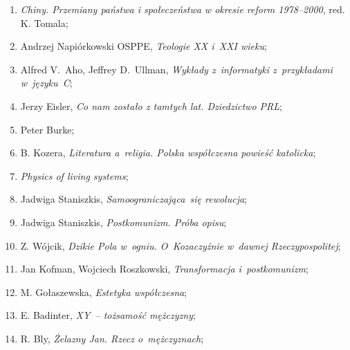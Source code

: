 \documentclass[a4paper,11pt]{article}
\begin{document}
\begin{enumerate}
\item \textit{Chiny. Przemiany państwa i społeczeństwa w okresie reform
    1978--2000}, red. K. Tomala;



\item Andrzej Napiórkowski OSPPE, \textit{Teologie XX i~XXI wieku};



\item Alfred V.~Aho, Jeffrey D.~Ullman, \textit{Wykłady z~informatyki
    z~przykładami w~języku~C};



\item Jerzy Eisler, \textit{Co nam zostało z tamtych lat. Dziedzictwo
    PRL};



\item Peter Burke;



\item B. Kozera, \textit{Literatura a~religia. Polska współczesna
    powieść katolicka};



\item \textit{Physics of living systems};



\item Jadwiga Staniszkis, \textit{Samoograniczająca~się rewolucja};



\item Jadwiga Staniszkis, \textit{Postkomunizm. Próba opisu};



\item Z. Wójcik, \textit{Dzikie Pola w~ogniu. O~Kozaczyźnie w~dawnej
    Rzeczypospolitej};



\item Jan Kofman, Wojciech Roszkowski, \textit{Transformacja
    i~postkomunizm};



\item M. Gołaszewska, \textit{Estetyka współczesna};



\item E. Badinter, \textit{XY~-- tożsamość mężczyzny};



\item R. Bly, \textit{Żelazny Jan. Rzecz o~mężczyznach};




\end{enumerate}
\end{document}
